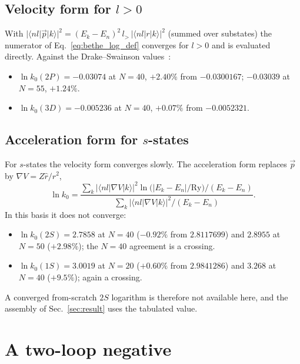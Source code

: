 \documentclass[11pt]{article}
\begin{document}
\subsection{\texorpdfstring{Velocity form for $l > 0$}{Velocity form for l > 0}}

With $|\langle nl|\vec p|k\rangle|^2 = (E_k - E_n)^2\, l_>\,
|\langle nl|r|k\rangle|^2$ (summed over substates) the numerator of
Eq.~\eqref{eq:bethe_log_def} converges for $l > 0$ and is evaluated
directly.  Against the Drake--Swainson values~\cite{drake_swainson}:
\begin{itemize}
\setlength\itemsep{0pt}
\item $\ln k_0(2P) = -0.03074$ at $N = 40$, $+2.40\%$ from
$-0.0300167$; $-0.03039$ at $N = 55$, $+1.24\%$.
\item $\ln k_0(3D) = -0.005236$ at $N = 40$, $+0.07\%$ from
$-0.0052321$.
\end{itemize}

\subsection{\texorpdfstring{Acceleration form for $s$-states}{Acceleration form for s-states}}

For $s$-states the velocity form converges slowly.  The acceleration
form replaces $\vec p$ by $\nabla V = Z\hat r/r^2$,
\begin{equation}
\ln k_0 = \frac{\sum_k |\langle nl|\nabla V|k\rangle|^2
\ln\bigl(|E_k - E_n|/\mathrm{Ry}\bigr)/(E_k - E_n)}
{\sum_k |\langle nl|\nabla V|k\rangle|^2/(E_k - E_n)}.
\end{equation}
In this basis it does not converge:
\begin{itemize}
\setlength\itemsep{0pt}
\item $\ln k_0(2S) = 2.7858$ at $N = 40$ ($-0.92\%$ from $2.8117699$)
and $2.8955$ at $N = 50$ ($+2.98\%$); the $N = 40$ agreement is a
crossing.
\item $\ln k_0(1S) = 3.0019$ at $N = 20$ ($+0.60\%$ from $2.9841286$)
and $3.268$ at $N = 40$ ($+9.5\%$); again a crossing.
\end{itemize}
A converged from-scratch $2S$ logarithm is therefore not available
here, and the assembly of Sec.~\ref{sec:result} uses the tabulated
value.

\section{A two-loop negative}
\label{sec:twoloop}
\end{document}
